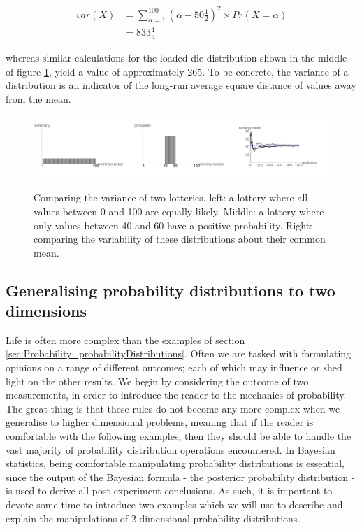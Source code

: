 \documentclass[11pt,fullpage]{book}
\begin{document}
\begin{equation}
\begin{align}
var(X) &= \sum\limits_{\alpha=1}^{100} (\alpha-50\tfrac{1}{2})^2\times Pr(X=\alpha)\\
&= 833\tfrac{1}{4}
\end{align}
\end{equation}

whereas similar calculations for the loaded die distribution shown in the middle of figure \ref{fig:Probability_varianceLottery}, yield a value of approximately 265. To be concrete, the variance of a distribution is an indicator of the long-run average square distance of values away from the mean. 

\begin{figure}
\centering
\scalebox{0.35} 
{\includegraphics{Probability_varianceLottery.pdf}}
\caption{Comparing the variance of two lotteries, left: a lottery where all values between 0 and 100 are equally likely. Middle: a lottery where only values between 40 and 60 have a positive probability. Right: comparing the variability of these distributions about their common mean.}\label{fig:Probability_varianceLottery}
\end{figure} 

\subsection{Generalising probability distributions to two dimensions}
Life is often more complex than the examples of section \ref{sec:Probability_probabilityDistributions}. Often we are tasked with formulating opinions on a range of different outcomes; each of which may influence or shed light on the other results. We begin by considering the outcome of two measurements, in order to introduce the reader to the mechanics of probability. The great thing is that these rules do not become any more complex when we generalise to higher dimensional problems, meaning that if the reader is comfortable with the following examples, then they should be able to handle the vast majority of probability distribution operations encountered. In Bayesian statistics, being comfortable manipulating probability distributions is essential, since the output of the Bayesian formula - the posterior probability distribution - is used to derive all post-experiment conclusions. As such, it is important to devote some time to introduce two examples which we will use to describe and explain the manipulations of 2-dimensional probability distributions.
\end{document}
